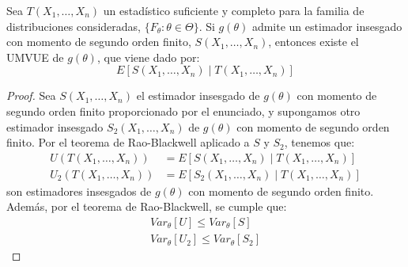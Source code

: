 \begin{teo}
    Sea $T(X_1, \ldots, X_n)$ un estadístico suficiente y completo para la familia de distribuciones consideradas, $\{F_\theta : \theta \in \Theta\}$. Si $g(\theta)$ admite un estimador insesgado con momento de segundo orden finito, $S(X_1, \ldots, X_n)$, entonces existe el UMVUE de $g(\theta)$, que viene dado por:
    \begin{equation*}
        E[S(X_1, \ldots, X_n) \mid T(X_1, \ldots, X_n)]
    \end{equation*}

    \begin{proof}
        Sea $S(X_1, \ldots, X_n)$ el estimador insesgado de $g(\theta)$ con momento de segundo orden finito proporcionado por el enunciado, y supongamos otro estimador insesgado $S_2(X_1, \ldots, X_n)$ de $g(\theta)$ con momento de segundo orden finito. Por el teorema de Rao-Blackwell aplicado a $S$ y $S_2$, tenemos que:
        \begin{align*}
            U(T(X_1, \ldots, X_n)) &= E[S(X_1, \ldots, X_n) \mid T(X_1, \ldots, X_n)]\\
            U_2(T(X_1, \ldots, X_n)) &= E[S_2(X_1, \ldots, X_n) \mid T(X_1, \ldots, X_n)]
        \end{align*}
        son estimadores insesgados de $g(\theta)$ con momento de segundo orden finito. Además, por el teorema de Rao-Blackwell, se cumple que:
        \begin{align*}
            Var_\theta[U] \leq Var_\theta[S]\\
            Var_\theta[U_2] \leq Var_\theta[S_2]
        \end{align*}


\end{proof}
\end{teo}
